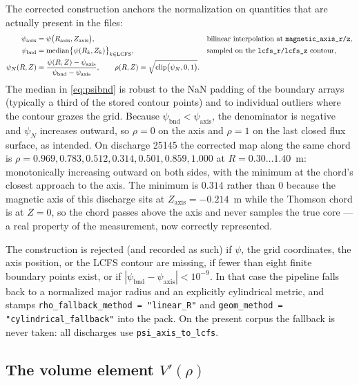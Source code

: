 The corrected construction anchors the normalization on quantities that are
actually present in the files:
\begin{align}
\psi_{\mathrm{axis}} &= \psi\big(R_{\mathrm{axis}}, Z_{\mathrm{axis}}\big),
&& \text{bilinear interpolation at \texttt{magnetic\_axis\_r/z}},
\label{eq:psiaxis}\\
\psi_{\mathrm{bnd}} &= \mathrm{median}\big\{\psi(R_k, Z_k)\big\}_{k \in \mathrm{LCFS}},
&& \text{sampled on the \texttt{lcfs\_r/lcfs\_z} contour},
\label{eq:psibnd}\\
\psi_N(R,Z) &= \frac{\psi(R,Z) - \psi_{\mathrm{axis}}}{\psi_{\mathrm{bnd}} - \psi_{\mathrm{axis}}},
\qquad
\rho(R,Z) = \sqrt{\mathrm{clip}\big(\psi_N, 0, 1\big)}.
\label{eq:rho}
\end{align}
The median in \eqref{eq:psibnd} is robust to the NaN padding of the
boundary arrays (typically a third of the stored contour points) and to
individual outliers where the contour grazes the grid. Because
$\psi_{\mathrm{bnd}} < \psi_{\mathrm{axis}}$, the denominator is negative
and $\psi_N$ increases outward, so $\rho = 0$ on the axis and $\rho = 1$ on
the last closed flux surface, as intended. On discharge 25145 the corrected
map along the same chord is $\rho = 0.969, 0.783, 0.512, 0.314, 0.501,
0.859, 1.000$ at $R = 0.30 \dots 1.40$~m: monotonically increasing outward
on both sides, with the minimum at the chord's closest approach to the
axis. The minimum is $0.314$ rather than $0$ because the magnetic axis of
this discharge sits at $Z_{\mathrm{axis}} = -0.214$~m while the Thomson
chord is at $Z = 0$, so the chord passes above the axis and never samples
the true core --- a real property of the measurement, now correctly
represented.

The construction is rejected (and recorded as such) if $\psi$, the grid
coordinates, the axis position, or the LCFS contour are missing, if fewer
than eight finite boundary points exist, or if
$|\psi_{\mathrm{bnd}} - \psi_{\mathrm{axis}}| < 10^{-9}$. In that case the
pipeline falls back to a normalized major radius and an explicitly
cylindrical metric, and stamps
\texttt{rho\_fallback\_method = "linear\_R"} and
\texttt{geom\_method = "cylindrical\_fallback"} into the pack. On the
present corpus the fallback is never taken: all discharges use
\texttt{psi\_axis\_to\_lcfs}.

\subsection{The volume element $V'(\rho)$}
\label{app:eq-vprime}

